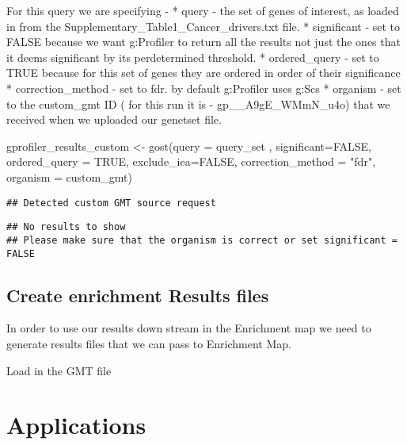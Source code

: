 \documentclass[
]{book}
\newenvironment{Shaded}{\begin{snugshade}}{\end{snugshade}}
\newcommand{\AttributeTok}[1]{\textcolor[rgb]{0.77,0.63,0.00}{#1}}
\newcommand{\ConstantTok}[1]{\textcolor[rgb]{0.00,0.00,0.00}{#1}}
\newcommand{\FunctionTok}[1]{\textcolor[rgb]{0.00,0.00,0.00}{#1}}
\newcommand{\NormalTok}[1]{#1}
\newcommand{\OtherTok}[1]{\textcolor[rgb]{0.56,0.35,0.01}{#1}}
\newcommand{\StringTok}[1]{\textcolor[rgb]{0.31,0.60,0.02}{#1}}
\begin{document}
For this query we are specifying -
* query - the set of genes of interest, as loaded in from the Supplementary\_Table1\_Cancer\_drivers.txt file.
* significant - set to FALSE because we want g:Profiler to return all the results not just the ones that it deems significant by its perdetermined threshold.
* ordered\_query - set to TRUE because for this set of genes they are ordered in order of their significance
* correction\_method - set to fdr. by default g:Profiler uses g:Scs
* organism - set to the custom\_gmt ID ( for this run it is - gp\_\_A9gE\_WMmN\_u4o) that we received when we uploaded our genetset file.

\begin{Shaded}
\begin{Highlighting}[]
\NormalTok{gprofiler\_results\_custom }\OtherTok{\textless{}{-}} \FunctionTok{gost}\NormalTok{(}\AttributeTok{query =}\NormalTok{ query\_set ,}
                                     \AttributeTok{significant=}\ConstantTok{FALSE}\NormalTok{,}
                                 \AttributeTok{ordered\_query =} \ConstantTok{TRUE}\NormalTok{,}
                                    \AttributeTok{exclude\_iea=}\ConstantTok{FALSE}\NormalTok{,}
                                     \AttributeTok{correction\_method =} \StringTok{"fdr"}\NormalTok{,}
                                     \AttributeTok{organism =}\NormalTok{ custom\_gmt)}
\end{Highlighting}
\end{Shaded}

\begin{verbatim}
## Detected custom GMT source request
\end{verbatim}

\begin{verbatim}
## No results to show
## Please make sure that the organism is correct or set significant = FALSE
\end{verbatim}

\hypertarget{create-enrichment-results-files}{%
\section{Create enrichment Results files}\label{create-enrichment-results-files}}

In order to use our results down stream in the Enrichment map we need to generate results files that we can pass to Enrichment Map.

Load in the GMT file

\hypertarget{applications}{%
\chapter{Applications}\label{applications}}
\end{document}
